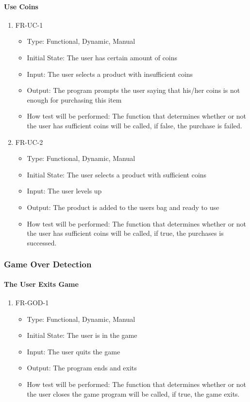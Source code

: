 \documentclass[12,english]{article}
\begin{document}
\paragraph{Use Coins}
\begin{enumerate}
  \item FR-UC-1
  \begin{itemize}
      \item Type: Functional, Dynamic, Manual
      \item Initial State: The user has certain amount of coins
      \item Input: The user selects a product with insufficient coins 
      \item Output: The program prompts the user saying that his/her coins is not enough for purchasing this item
      \item How test will be performed:  The function that determines whether or not the user has sufficient coins will be called, if false, the purchase is failed.
  \end{itemize}
  \item FR-UC-2
  \begin{itemize}
      \item Type: Functional, Dynamic, Manual
      \item Initial State: The user selects a product with sufficient coins
      \item Input: The user levels up
      \item Output: The product is added to the user\textcolor{red}{\textquotesingle}s bag and ready to use
      \item How test will be performed: The function that determines whether or not the user has sufficient coins will be called, if true, the purchases is successed.   
  \end{itemize}
\end{enumerate}

\subsubsection{Game Over Detection}
\paragraph{The User Exits Game}
\begin{enumerate}
  \item FR-GOD-1
  \begin{itemize}
      \item Type: Functional, Dynamic, Manual
      \item Initial State: The user is in the game 
      \item Input: The user quits the game
      \item Output: The program ends and exits
      \item How test will be performed: The function that determines whether or not the user closes the game program will be called, if true, the game exits.
  \end{itemize}
\end{enumerate}
\end{document}
